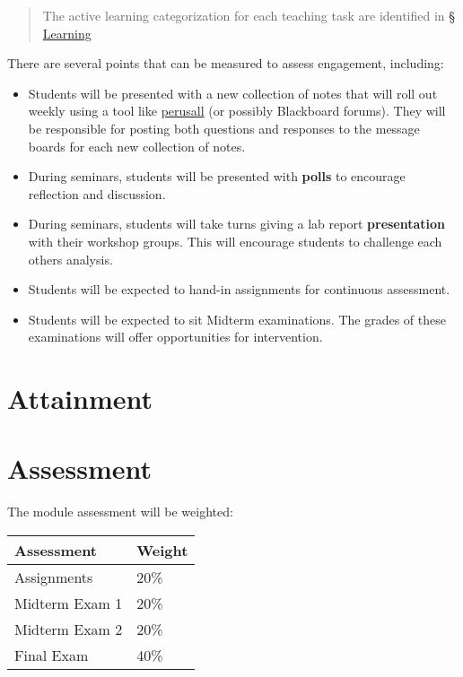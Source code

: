\documentclass[
]{book}
\providecommand{\tightlist}{%
  \setlength{\itemsep}{0pt}\setlength{\parskip}{0pt}}
\begin{document}
\begin{quote}
The active learning categorization for each teaching task are identified in \protect\hyperlink{learning}{§ Learning}
\end{quote}

There are several points that can be measured to assess engagement, including:

\begin{itemize}
\tightlist
\item
  Students will be presented with a new collection of notes that will roll out weekly using a tool like \href{https://perusall.com/}{perusall} (or possibly Blackboard forums). They will be responsible for posting both questions and responses to the message boards for each new collection of notes.\\
\item
  During seminars, students will be presented with \textbf{polls} to encourage reflection and discussion.
\item
  During seminars, students will take turns giving a lab report \textbf{presentation} with their workshop groups. This will encourage students to challenge each others analysis.
\item
  Students will be expected to hand-in assignments for continuous assessment.
\item
  Students will be expected to sit Midterm examinations. The grades of these examinations will offer opportunities for intervention.
\end{itemize}

\hypertarget{attainment}{%
\chapter{Attainment}\label{attainment}}

\hypertarget{assessment}{%
\chapter{Assessment}\label{assessment}}

The module assessment will be weighted:

\begin{tabular}{l|l}
\hline
Assessment & Weight\\
\hline
Assignments & 20\%\\
\hline
Midterm Exam 1 & 20\%\\
\hline
Midterm Exam 2 & 20\%\\
\hline
Final Exam & 40\%\\
\hline
\end{tabular}
\end{document}
